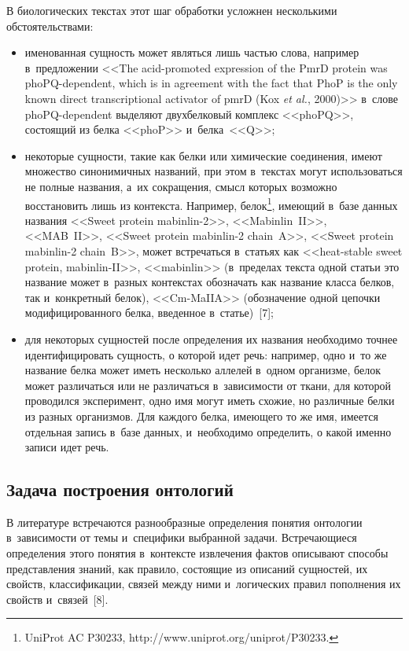 \begin{multicols}{2}
  В биологических текстах этот шаг обработки усложнен несколькими 
обстоятельствами:
  \begin{itemize}
\item именованная сущность может являться лишь частью слова, например 
в~предложении <<The acid-promoted expression of the PmrD protein was  
phoPQ-dependent, which is in agreement with the fact that PhoP is the only known 
direct transcriptional activator of pmrD (Kox \textit{et al.}, 2000)>> в~слове  
phoPQ-dependent выделяют двухбелковый комплекс <<phoPQ>>, состоящий из 
белка <<phoP>> и~белка~<<Q>>;\\[-15pt]
\item некоторые сущности, такие как белки или химические соединения, имеют множество синонимичных 
названий, при этом в~текстах могут использоваться не полные названия, а~их сокращения, смысл которых 
возможно восстановить лишь из контекста. Например, белок\footnote{UniProt AC P30233, {\sf 
http://www.uniprot.org/uniprot/P30233}.}, имеющий в~базе данных названия <<Sweet protein 
mabinlin-2>>, <<Mabinlin~II>>, <<MAB~II>>, <<Sweet protein mabinlin-2 chain~A>>, 
<<Sweet protein 
\mbox{mabinlin-2} chain~B>>, может встречаться в~стать\-ях как <<heat-stable sweet protein, mabinlin-II>>, 
<<mabinlin>> (в~пределах текста одной статьи это название может в~разных контекстах обозначать как 
название класса белков, так и~конкретный белок), <<Cm-MaIIA>> (обозначение одной цепочки 
модифицированного белка, введенное в~статье)~[7];\\[-15pt]
\item для некоторых сущностей после определения их названия необходимо 
точнее идентифицировать сущность, о которой идет речь: например, одно и~то 
же название белка может иметь несколько аллелей в~одном организме, белок 
может различаться или не различаться в~зависимости от ткани, для которой 
проводился эксперимент, одно имя могут иметь схожие, но различные белки из 
разных организмов. Для каждого белка, имеющего то же имя, имеется 
отдельная запись в~базе данных, и~необходимо определить, о какой именно 
записи идет речь.
\end{itemize}

\vspace*{-10pt}

  \subsection{Задача построения онтологий}
  
  В литературе встречаются разнообразные определения понятия онтологии 
в~зависимости от темы и~специфики выбранной задачи. Встречающиеся 
определения этого понятия в~контексте извлечения фактов описывают способы 
представления знаний, как правило, состоящие из описаний сущностей, их 
свойств, классификации, связей между ними и~логических правил пополнения 
их свойств и~связей~[8].
  

\end{multicols}
